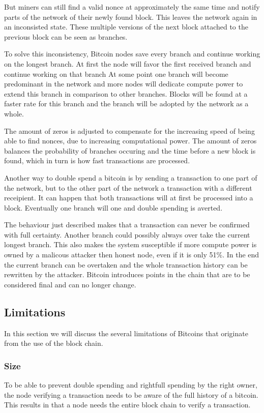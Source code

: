 But miners can still find a valid nonce at approximately the same time
and notify parts of the network of their newly found block.
This leaves the network again in an inconsisted state.
These multiple versions of the next block attached to the previous block can be seen as branches.

To solve this inconsistency, Bitcoin nodes save every branch and continue working on the longest branch.
At first the node will favor the first received branch and continue working on that branch
At some point one branch will become predominant in the network
and more nodes will dedicate compute power to extend this branch in comparison to other branches.
Blocks will be found at a faster rate for this branch
and the branch will be adopted by the network as a whole.

The amount of zeros is adjusted to compensate for the increasing speed of being able to find nonces, due to increasing computational power.
The amount of zeros balances the probability of branches occuring
and the time before a new block is found,
which in turn is how fast transactions are processed.

Another way to double spend a bitcoin is by sending a transaction to one part of the network,
but to the other part of the network a transaction with a different receipient.
It can happen that both transactions will at first be processed into a block.
Eventually one branch will one and double spending is averted.

The behaviour just described makes that a transaction can never be confirmed with full certainty.
Another branch could possibly always over take the current longest branch.
This also makes the system susceptible if more compute power is owned by a malicous attacker then honest node, even if it is only 51\%. 
In the end the current branch can be overtaken
and the whole transaction history can be rewritten by the attacker.
Bitcoin introduces points in the chain that are to be considered final and can no longer change.

\subsection{Limitations}
In this section we will discuss the several limitations of Bitcoins
that originate from the use of the block chain.

\subsubsection{Size}
To be able to prevent double spending and rightfull spending by the right owner, 
the node verifying a transaction needs to be aware of the full history of a bitcoin.
This results in that a node needs the entire block chain to verify a transaction.

